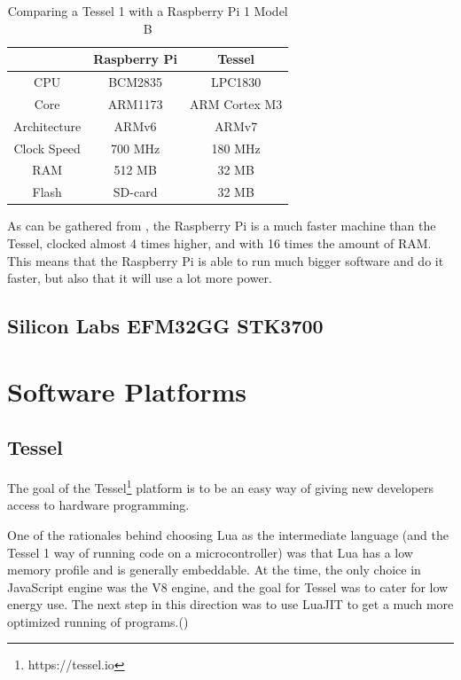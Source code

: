 \begin{table}[h]
\centering
\begin{tabular}{| c | c | c |}
\hline
            & Raspberry Pi  & Tessel        \\ \hline
CPU         & BCM2835       & LPC1830       \\ \hline
Core        & ARM1173       & ARM Cortex M3 \\ \hline
Architecture& ARMv6         & ARMv7         \\ \hline
Clock Speed & 700 MHz       & 180 MHz       \\ \hline
RAM         & 512 MB        & 32 MB         \\ \hline
Flash       & SD-card       & 32 MB         \\
\hline
\end{tabular}
\caption{Comparing a Tessel 1 with a Raspberry Pi 1 Model B}
\label{tab:specs}
\end{table}


As can be gathered from , the Raspberry Pi is a much faster machine than the Tessel, clocked almost 4 times higher, and with 16 times the amount of RAM.
This means that the Raspberry Pi is able to run much bigger software and do it faster, but also that it will use a lot more power.

\subsection{Silicon Labs EFM32GG STK3700}

\section{Software Platforms}
\subsection{Tessel}
The goal of the Tessel\footnote{https://tessel.io} platform is to be an easy way of giving new developers access to hardware programming.

One of the rationales behind choosing Lua as the intermediate language (and the Tessel 1 way of running code on a microcontroller) was that Lua has a low memory profile and is generally embeddable.
At the time, the only choice in JavaScript engine was the V8 engine, and the goal for Tessel was to cater for low energy use.
The next step in this direction was to use LuaJIT to get a much more optimized running of programs.(\cite{newengine})

